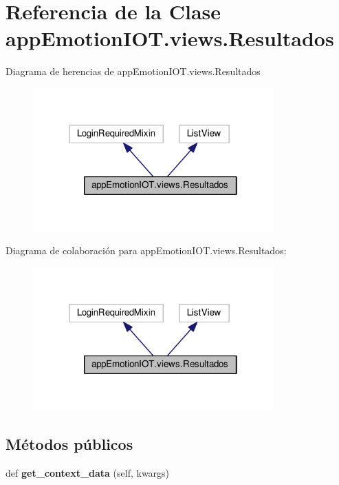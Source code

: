 \hypertarget{classappEmotionIOT_1_1views_1_1Resultados}{}\section{Referencia de la Clase app\+Emotion\+I\+O\+T.\+views.\+Resultados}
\label{classappEmotionIOT_1_1views_1_1Resultados}


Diagrama de herencias de app\+Emotion\+I\+O\+T.\+views.\+Resultados
\nopagebreak
\begin{figure}[H]
\begin{center}
\leavevmode
\includegraphics[width=262pt]{classappEmotionIOT_1_1views_1_1Resultados__inherit__graph}
\end{center}
\end{figure}


Diagrama de colaboración para app\+Emotion\+I\+O\+T.\+views.\+Resultados\+:
\nopagebreak
\begin{figure}[H]
\begin{center}
\leavevmode
\includegraphics[width=262pt]{classappEmotionIOT_1_1views_1_1Resultados__coll__graph}
\end{center}
\end{figure}
\subsection*{Métodos públicos}
\begin{DoxyCompactItemize}
\item 
def {\bfseries get\+\_\+context\+\_\+data} (self, kwargs)\hypertarget{classappEmotionIOT_1_1views_1_1Resultados_a9e1e0eea2b02cebc38299521b63c56ff}{}\label{classappEmotionIOT_1_1views_1_1Resultados_a9e1e0eea2b02cebc38299521b63c56ff}

\end{DoxyCompactItemize}
